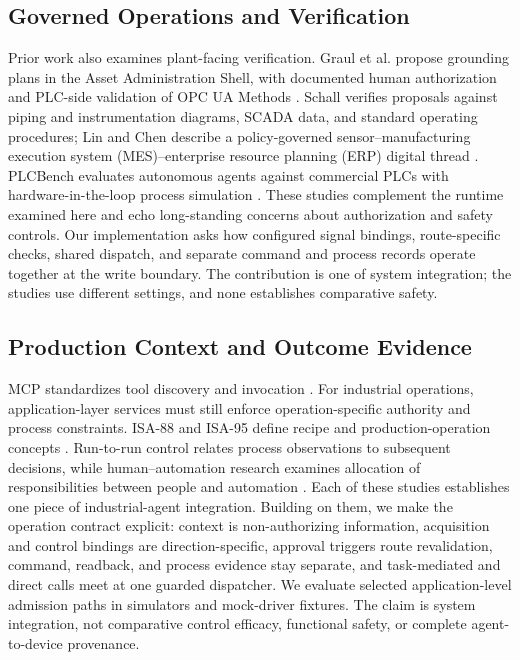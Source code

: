 \subsection{Governed Operations and Verification}
Prior work also examines plant-facing verification. Graul et al. propose grounding plans in the Asset Administration Shell, with documented human authorization and PLC-side validation of OPC UA Methods \cite{graul2026aas}. Schall verifies proposals against piping and instrumentation diagrams, SCADA data, and standard operating procedures; Lin and Chen describe a policy-governed sensor--manufacturing execution system (MES)--enterprise resource planning (ERP) digital thread \cite{schall2026safe,lin2026agentic}. PLCBench evaluates autonomous agents against commercial PLCs with hardware-in-the-loop process simulation \cite{zhou2026plcbench}. These studies complement the runtime examined here and echo long-standing concerns about authorization and safety controls. Our implementation asks how configured signal bindings, route-specific checks, shared dispatch, and separate command and process records operate together at the write boundary. The contribution is one of system integration; the studies use different settings, and none establishes comparative safety.

\subsection{Production Context and Outcome Evidence}
MCP standardizes tool discovery and invocation \cite{mcp2026}. For industrial operations, application-layer services must still enforce operation-specific authority and process constraints. ISA-88 and ISA-95 define recipe and production-operation concepts \cite{isa88_2010,isa95_2025}. Run-to-run control relates process observations to subsequent decisions, while human--automation research examines allocation of responsibilities between people and automation \cite{moyne2001r2r,parasuraman2000model}. Each of these studies establishes one piece of industrial-agent integration. Building on them, we make the operation contract explicit: context is non-authorizing information, acquisition and control bindings are direction-specific, approval triggers route revalidation, command, readback, and process evidence stay separate, and task-mediated and direct calls meet at one guarded dispatcher. We evaluate selected application-level admission paths in simulators and mock-driver fixtures. The claim is system integration, not comparative control efficacy, functional safety, or complete agent-to-device provenance.
